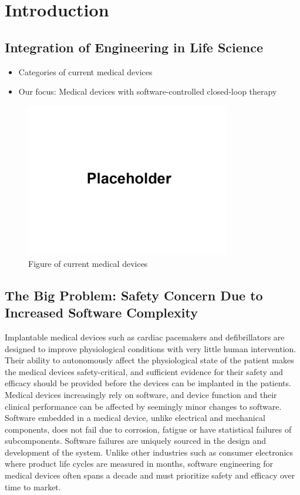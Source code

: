\chapter{Introduction}
\section{Integration of Engineering in Life Science}

\begin{itemize}
	\item Categories of current medical devices
	\item Our focus: Medical devices with software-controlled closed-loop therapy
\end{itemize}
\begin{figure}[t]
		\centering
		\includegraphics[width=0.8\textwidth]{figs/placeholder.png}
		\caption{\small Figure of current medical devices}
		\label{fig:Cur}
\end{figure}

\section{The Big Problem: Safety Concern Due to Increased Software Complexity}
Implantable medical devices such as cardiac pacemakers and defibrillators are designed to improve physiological conditions with very little human intervention. 
Their ability to autonomously affect the physiological state of the patient makes the medical devices safety-critical, and sufficient evidence for their safety and efficacy should be provided before the devices can be implanted in the patients. Medical devices increasingly rely on software, and device function and their clinical performance can be affected by seemingly minor changes to software. Software embedded in a medical device, unlike electrical and mechanical components, does not fail due to corrosion, fatigue or have statistical failures of subcomponents. Software failures are uniquely sourced in the design and development of the system. Unlike other industries such as consumer electronics where product life cycles are measured in months, software engineering for medical devices often spans a decade and must prioritize safety and efficacy over time to market. 

